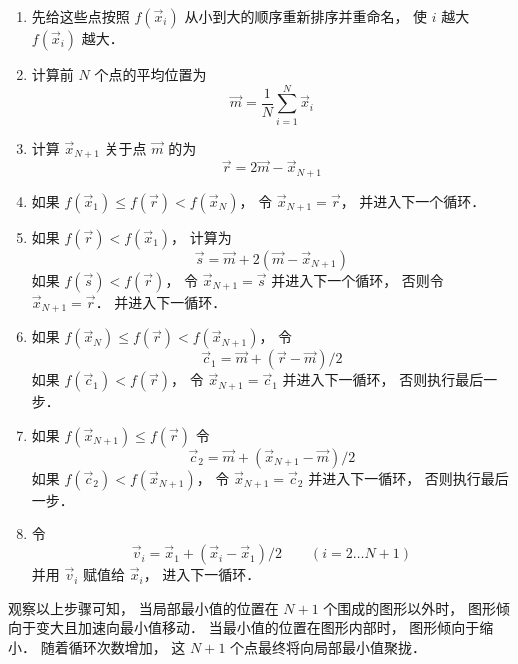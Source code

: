 \begin{enumerate}
\item 先给这些点按照 $f(\vec x_i)$ 从小到大的顺序重新排序并重命名， 使 $i$ 越大 $f(\vec x_i)$ 越大．

\item 计算前 $N$ 个点的平均位置为
\begin{equation}
\vec m = \frac 1N \sum_{i=1}^N \vec x_i
\end{equation}

\item 计算 $\vec x_{N + 1}$ 关于点 $\vec m$ 的为
\begin{equation}
\vec r = 2\vec m - \vec x_{N + 1}
\end{equation}

\item 如果 $f(\vec x_1) \le f(\vec r) < f(\vec x_N)$， 令 $\vec x_{N+1} = \vec r$， 并进入下一个循环．

\item 如果 $f(\vec r) < f(\vec x_1)$， 计算为
\begin{equation}
\vec s = \vec m + 2(\vec m - \vec x_{N+1})
\end{equation}
如果 $f(\vec s) < f(\vec r)$， 令 $\vec x_{N+1} = \vec s$ 并进入下一个循环， 否则令 $\vec x_{N+1} = \vec r$． 并进入下一循环．

\item 如果 $f(\vec x_N) \le f(\vec r) < f(\vec x_{N+1})$， 令
\begin{equation}
\vec c_1 = \vec m + (\vec r - \vec m)/2
\end{equation}
如果 $f(\vec c_1) < f(\vec r)$， 令 $\vec x_{N + 1} = \vec c_1$ 并进入下一循环， 否则执行最后一步．

\item 如果 $f(\vec x_{N+1}) \le f(\vec r)$ 令
\begin{equation}
\vec c_2 = \vec m + (\vec x_{N+1} - \vec m)/2
\end{equation}
如果 $f(\vec c_2) < f(\vec x_{N+1})$， 令 $\vec x_{N+1}  = \vec c_2$ 并进入下一循环， 否则执行最后一步．

\item 令
\begin{equation}
\vec v_i = \vec x_1 + (\vec x_i - \vec x_1)/2 \qquad (i = 2\dots N+1)
\end{equation}
并用 $\vec v_i$ 赋值给 $\vec x_i$， 进入下一循环．
\end{enumerate}

观察以上步骤可知， 当局部最小值的位置在 $N+1$ 个围成的图形以外时， 图形倾向于变大且加速向最小值移动． 当最小值的位置在图形内部时， 图形倾向于缩小． 随着循环次数增加， 这 $N+1$ 个点最终将向局部最小值聚拢． 

